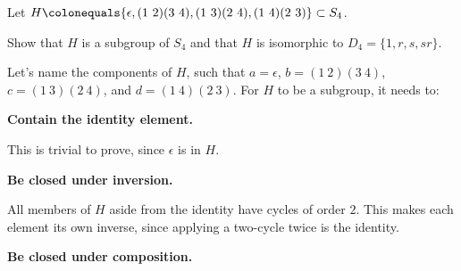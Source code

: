 \begin{problem}
  Let $H \colonequals \{\epsilon,(1\ 2)(3\ 4),(1\ 3)(2\ 4),(1\ 4)(2\ 3)\} \subset 
  S_4$. 
  \begin{enumalph}
    \item Show that $H$ is a subgroup of $S_4$ and that $H$ is isomorphic to
    $D_4 = \{1,r,s,sr\}$.
    \begin{Answer}
      Let's name the components of $H$, such that
      $a = \epsilon$, $b = (1\ 2)(3\ 4)$, $c = (1\ 3)(2\ 4)$, and $d = (1\ 4)(2\ 3)$.
      For $H$ to be a subgroup, it needs to:
      \begin{enumalph}
        \item \textbf{Contain the identity element.}
        
          \noindent
          This is trivial to prove, since $\epsilon$ is in $H$.
        \item \textbf{Be closed under inversion.}
          
          \noindent
          All members of $H$ aside from the identity have cycles of order $2$.
          This makes each element its own inverse, since applying
          a two-cycle twice is the identity.
        \item \textbf{Be closed under composition.}
        

\end{enumalph}
\end{Answer}
\end{enumalph}
\end{problem}
